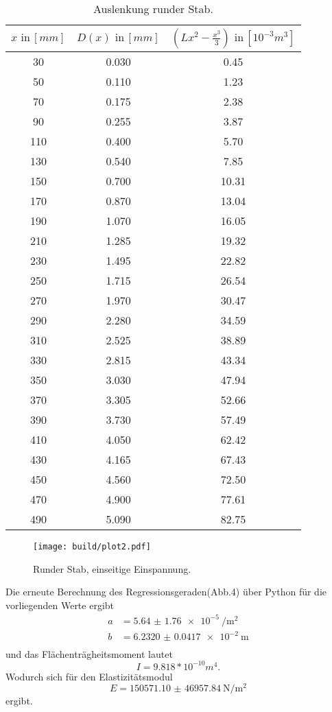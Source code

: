 \begin{table}[h]
  \centering
  \label{tab:lit3}
  \begin{tabular}{ c c c }
    \toprule
    $x \,\, \text{in} \, [mm]$
   &{$D(x) \,\, \text{in} \, [mm]$}
   &{$(Lx^2- \frac{x^3}{3}) \,\, \text{in} \, [10^{-3}m^3]$} \\

    \midrule
    30 & 0.030 & 0.45\\
    50 & 0.110 & 1.23\\
    70 & 0.175 & 2.38\\
    90 & 0.255 & 3.87\\
    110& 0.400 & 5.70\\
    130& 0.540 & 7.85\\
    150& 0.700 &10.31\\
    170& 0.870 &13.04\\
    190& 1.070 &16.05\\
    210& 1.285 &19.32\\
    230& 1.495 &22.82\\
    250& 1.715 &26.54\\
    270& 1.970 &30.47\\
    290& 2.280 &34.59\\
    310& 2.525 &38.89\\
    330& 2.815 &43.34\\
    350& 3.030 &47.94\\
    370& 3.305 &52.66\\
    390& 3.730 &57.49\\
    410& 4.050 &62.42\\
    430& 4.165 &67.43\\
    450& 4.560 &72.50\\
    470& 4.900 &77.61\\
    490& 5.090 &82.75\\

    \bottomrule
  \end{tabular}
  \caption{Auslenkung runder Stab.}
\end{table}

\begin{figure}[h]
  \centering
  \texttt{[image: build/plot2.pdf]}
  \caption{Runder Stab, einseitige Einspannung.}
  \label{fig:plot2}
\end{figure}

Die erneute Berechnung des Regressionsgeraden(Abb.4) über Python
für die vorliegenden Werte ergibt
\begin{align*}
  a &= \SI{5.64(176)e-5}{\per\square\meter} \\
  b &= \SI{6.2320(417)e-2}{\meter} \\
\end{align*}
und das Flächenträgheitsmoment lautet
\begin{equation*}
  I = 9.818* 10^{-10} m^4.
\end{equation*}
\newline
Wodurch sich für den Elastizitätsmodul
\begin{equation*}
  E = \SI{150571.10(4695784)}{\newton\per\square\meter}
\end{equation*}
ergibt.
\newpage
